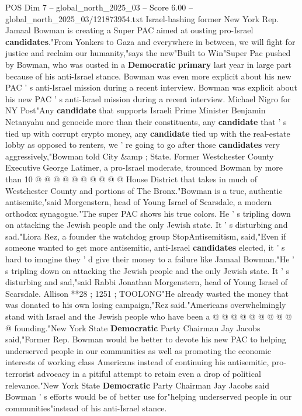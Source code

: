 \begin{textsample}{POS Dim 7 – global\_north\_2025\_03 – Score 6.00 – global\_north\_2025\_03/121873954.txt}  \label{ex:f7_pos_321}
Israel-bashing former New York Rep.
Jamaal Bowman is creating a Super PAC aimed at ousting pro-Israel \textbf{candidates}."From Yonkers to Gaza and everywhere in between, we will fight for justice and reclaim our humanity,"says the new"Built to Win"Super Pac pushed by Bowman, who was ousted in a \textbf{Democratic} \textbf{primary} last year in large part because of his anti-Israel stance.
Bowman was even more explicit about his new PAC ' s anti-Israel mission during a recent interview.
Bowman was explicit about his new PAC ' s anti-Israel mission during a recent interview.
Michael Nigro for NY Post"Any \textbf{candidate} that supports Israeli Prime Minister Benjamin Netanyahu and genocide more than their constituents, any \textbf{candidate} that ' s tied up with corrupt crypto money, any \textbf{candidate} tied up with the real-estate lobby as opposed to renters, we ' re going to go after those \textbf{candidates} very aggressively,"Bowman told City \&amp ; State.
Former Westchester County Executive George Latimer, a pro-Israel moderate, trounced Bowman by more than 10 @ @ @ @ @ @ @ @ @ @ House District that takes in much of Westchester County and portions of The Bronx."Bowman is a true, authentic antisemite,"said Morgenstern, head of Young Israel of Scarsdale, a modern orthodox synagogue."The super PAC shows his true colors.
He ' s tripling down on attacking the Jewish people and the only Jewish state.
It ' s disturbing and sad."Liora Rez, a founder the watchdog group StopAntisemitism, said,"Even if someone wanted to get more antisemitic, anti-Israel \textbf{candidates} elected, it ' s hard to imagine they ' d give their money to a failure like Jamaal Bowman."He ' s tripling down on attacking the Jewish people and the only Jewish state.
It ' s disturbing and sad,"said Rabbi Jonathan Morgenstern, head of Young Israel of Scarsdale.
Allison **28 ; 1251 ; TOOLONG"He already wasted the money that was donated to his own losing campaign,"Rez said."Americans overwhelmingly stand with Israel and the Jewish people who have been a @ @ @ @ @ @ @ @ @ @ founding."New York State \textbf{Democratic} Party Chairman Jay Jacobs said,"Former Rep.
Bowman would be better to devote his new PAC to helping underserved people in our communities as well as promoting the economic interests of working class Americans instead of continuing his antisemitic, pro-terrorist advocacy in a pitiful attempt to retain even a drop of political relevance."New York State \textbf{Democratic} Party Chairman Jay Jacobs said Bowman ' s efforts would be of better use for"helping underserved people in our communities"instead of his anti-Israel stance.

\end{textsample}
